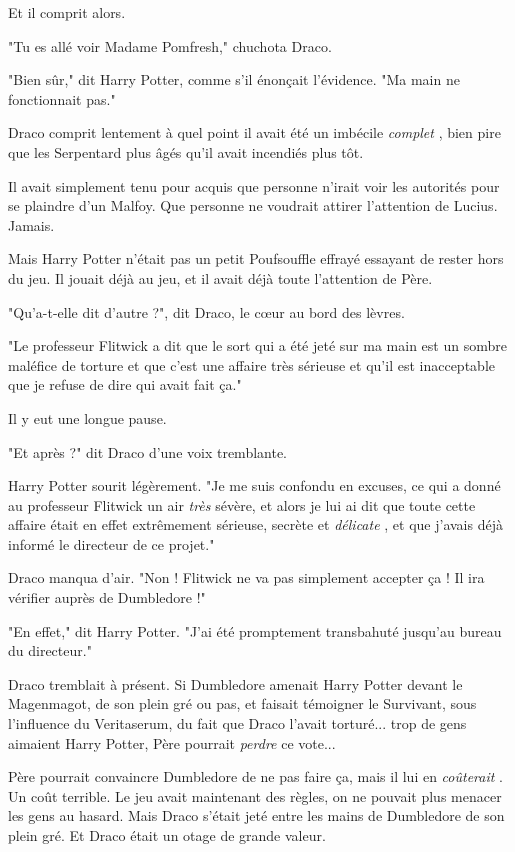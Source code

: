 Et il comprit alors.

"Tu es allé voir Madame Pomfresh," chuchota Draco.

"Bien sûr," dit Harry Potter, comme s'il énonçait l'évidence. "Ma main ne fonctionnait pas."

Draco comprit lentement à quel point il avait été un imbécile \emph{complet} , bien pire que les Serpentard plus âgés qu'il avait incendiés plus tôt.

Il avait simplement tenu pour acquis que personne n'irait voir les autorités pour se plaindre d'un Malfoy. Que personne ne voudrait attirer l'attention de Lucius. Jamais.

Mais Harry Potter n'était pas un petit Poufsouffle effrayé essayant de rester hors du jeu. Il jouait déjà au jeu, et il avait déjà toute l'attention de Père.

"Qu'a-t-elle dit d'autre ?", dit Draco, le cœur au bord des lèvres.

"Le professeur Flitwick a dit que le sort qui a été jeté sur ma main est un sombre maléfice de torture et que c'est une affaire très sérieuse et qu'il est inacceptable que je refuse de dire qui avait fait ça."

Il y eut une longue pause.

"Et après ?" dit Draco d'une voix tremblante.

Harry Potter sourit légèrement. "Je me suis confondu en excuses, ce qui a donné au professeur Flitwick un air \emph{très}  sévère, et alors je lui ai dit que toute cette affaire était en effet extrêmement sérieuse, secrète et \emph{délicate} , et que j'avais déjà informé le directeur de ce projet."

Draco manqua d'air. "Non ! Flitwick ne va pas simplement accepter ça ! Il ira vérifier auprès de Dumbledore !"

"En effet," dit Harry Potter. "J'ai été promptement transbahuté jusqu'au bureau du directeur."

Draco tremblait à présent. Si Dumbledore amenait Harry Potter devant le Magenmagot, de son plein gré ou pas, et faisait témoigner le Survivant, sous l'influence du Veritaserum, du fait que Draco l'avait torturé... trop de gens aimaient Harry Potter, Père pourrait \emph{perdre}  ce vote...

Père pourrait convaincre Dumbledore de ne pas faire ça, mais il lui en \emph{coûterait} . Un coût terrible. Le jeu avait maintenant des règles, on ne pouvait plus menacer les gens au hasard. Mais Draco s'était jeté entre les mains de Dumbledore de son plein gré. Et Draco était un otage de grande valeur.

